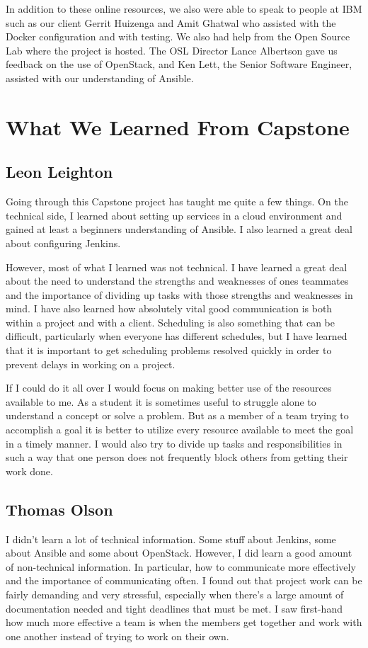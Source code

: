 \documentclass[10pt,letterpaper,onecolumn,draftclsnofoot]{IEEEtran}
\begin{document}
In addition to these online resources, we also were able to speak to people at IBM such as our client Gerrit Huizenga
and Amit Ghatwal who assisted with the Docker configuration and with testing. We also had help from the Open Source
Lab where the project is hosted. The OSL Director Lance Albertson gave us feedback on the use of OpenStack, and Ken
Lett, the Senior Software Engineer, assisted with our understanding of Ansible.
\clearpage
\section{What We Learned From Capstone}
\subsection{Leon Leighton}
Going through this Capstone project has taught me quite a few things.
On the technical side, I learned about setting up services in a cloud environment and gained at least a beginners
understanding of Ansible. I also learned a great deal about configuring Jenkins. 

However, most of what I learned was not technical. 
I have learned a great deal about the need to understand the strengths and weaknesses of ones teammates 
and the importance of dividing up tasks with those strengths and weaknesses in mind. 
I have also learned how absolutely vital good communication is both within a project and with a client. 
Scheduling is also something that can be difficult, particularly when everyone has different schedules, but
I have learned that it is important to get scheduling problems resolved quickly in order to prevent delays
in working on a project.

If I could do it all over I would focus on making better use of the resources available to me.
As a student it is sometimes useful to struggle alone to understand a concept or solve a problem.
But as a member of a team trying to accomplish a goal it is better to utilize every resource available to 
meet the goal in a timely manner.
I would also try to divide up tasks and responsibilities in such a way that one person does not frequently 
block others from getting their work done. 


\subsection{Thomas Olson}
I didn't learn a lot of technical information. Some stuff about Jenkins, some about Ansible and some about OpenStack.
However, I did learn a good amount of non-technical information. In particular, how to communicate more effectively and
the importance of communicating often. I found out that project work can be fairly demanding and very stressful,
especially when there's a large amount of documentation needed and tight deadlines that must be met. I saw first-hand
how much more effective a team is when the members get together and work with one another instead of trying to work
on their own.
\end{document}
